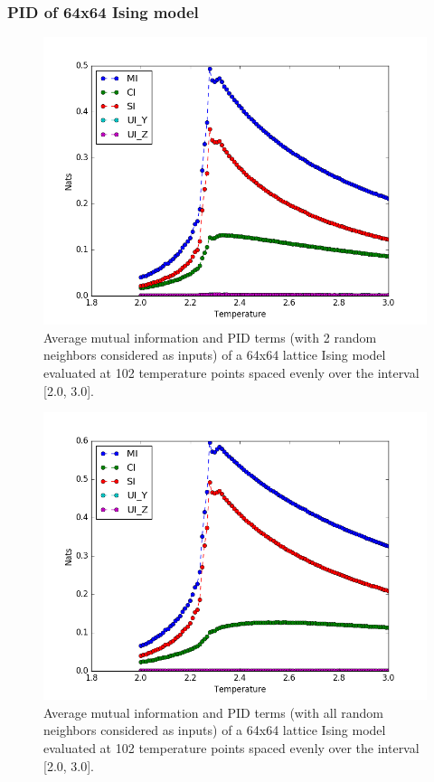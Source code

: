 \documentclass[12pt]{article}
\begin{document}
\subsubsection{PID of 64x64 Ising model}

\begin{figure} [h!]
\begin{center}
\includegraphics[width=.8\textwidth]{ising-64-pid-2-nbs}
\caption{Average mutual information and PID terms (with 2 random neighbors considered as inputs) of a 64x64 lattice Ising model evaluated at 102 temperature points spaced evenly over the interval [2.0, 3.0].}
\label{fig:ising-64-pid-2-nbs}
\end{center}
\end{figure}

\begin{figure} [h!]
\begin{center}
\includegraphics[width=.8\textwidth]{ising-64-pid-4-nbs}
\caption{Average mutual information and PID terms (with all random neighbors considered as inputs) of a 64x64 lattice Ising model evaluated at 102 temperature points spaced evenly over the interval [2.0, 3.0].}
\label{fig:ising-64-pid-4-nbs}
\end{center}
\end{figure}
\end{document}
